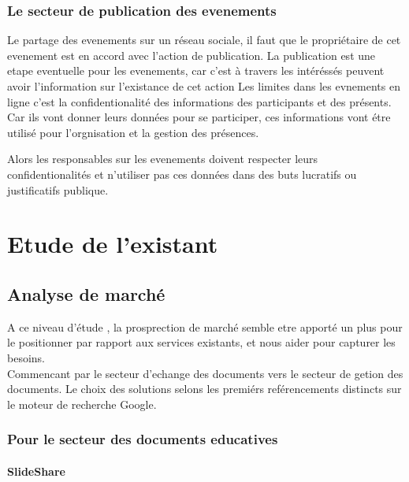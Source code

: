 \documentclass[12pt]{report}
\begin{document}
\subsubsection{Le secteur de publication des evenements}

Le partage des evenements sur un réseau sociale, il faut que le propriétaire de cet evenement est en accord avec l'action de publication.
La publication est une etape eventuelle pour les evenements, car c'est à travers les intéréssés peuvent avoir l'information sur l'existance de cet action
Les limites dans les evnements en ligne c'est la confidentionalité des informations des participants et des présents. Car ils vont donner leurs données pour se participer, ces informations vont étre utilisé pour l'orgnisation et la gestion des présences. 


Alors les responsables sur les evenements doivent respecter leurs confidentionalités et n'utiliser pas ces données dans des buts lucratifs ou justificatifs publique.

\section{Etude de l'existant}
\subsection{Analyse de marché}
A ce niveau d'étude , la prosprection de marché semble etre apporté un plus pour le positionner par rapport aux services existants, et nous aider pour capturer les besoins.\\
Commencant par le secteur d'echange des documents vers le secteur de getion des documents. Le choix des solutions selons les premiérs reférencements distincts sur le moteur de recherche Google.

\subsubsection*{Pour le secteur des documents educatives}

\paragraph{SlideShare}
\end{document}
